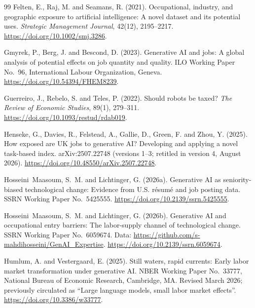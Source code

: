 \begin{thebibliography}{99}
Felten, E., Raj, M. and Seamans, R. (2021).
\newblock Occupational, industry, and geographic exposure to artificial intelligence: A novel dataset and its potential uses.
\newblock \emph{Strategic Management Journal}, 42(12), 2195--2217.
\newblock \url{https://doi.org/10.1002/smj.3286}.

Gmyrek, P., Berg, J. and Bescond, D. (2023).
\newblock Generative AI and jobs: A global analysis of potential effects on job quantity and quality.
\newblock ILO Working Paper No.~96, International Labour Organization, Geneva.
\newblock \url{https://doi.org/10.54394/FHEM8239}.

Guerreiro, J., Rebelo, S. and Teles, P. (2022).
\newblock Should robots be taxed?
\newblock \emph{The Review of Economic Studies}, 89(1), 279--311.
\newblock \url{https://doi.org/10.1093/restud/rdab019}.

Henseke, G., Davies, R., Felstead, A., Gallie, D., Green, F. and Zhou, Y. (2025).
\newblock How exposed are UK jobs to generative AI? Developing and applying a novel task-based index.
\newblock arXiv:2507.22748 (versions 1--3; retitled in version 4, August 2026).
\newblock \url{https://doi.org/10.48550/arXiv.2507.22748}.

Hosseini~Maasoum, S.~M. and Lichtinger, G. (2026a).
\newblock Generative AI as seniority-biased technological change: Evidence from U.S. r\'{e}sum\'{e} and job posting data.
\newblock SSRN Working Paper No.~5425555.
\newblock \url{https://doi.org/10.2139/ssrn.5425555}.

Hosseini~Maasoum, S.~M. and Lichtinger, G. (2026b).
\newblock Generative AI and occupational entry barriers: The labor-supply channel of technological change.
\newblock SSRN Working Paper No.~6059674. Data: \url{https://github.com/s-mahdihosseini/GenAI_Expertise}.
\newblock \url{https://doi.org/10.2139/ssrn.6059674}.

Humlum, A. and Vestergaard, E. (2025).
\newblock Still waters, rapid currents: Early labor market transformation under generative AI.
\newblock NBER Working Paper No.~33777, National Bureau of Economic Research, Cambridge, MA. Revised March 2026; previously circulated as ``Large language models, small labor market effects''.
\newblock \url{https://doi.org/10.3386/w33777}.


\end{thebibliography}
